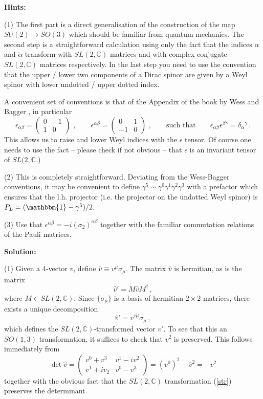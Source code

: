 \documentclass[12pt]{article}
\newcommand{\be}{\begin{equation}}
\newcommand{\ee}{\end{equation}}
\newcommand{\ol}{\overline}
\numberwithin{equation}{section}
\begin{document}
\noindent
{\bf Hints:} 

\noindent
(1) The first part is a direct generalisation of the construction of the map $SU(2)\to SO(3)$ which should be familiar from quantum mechanics. The second step is a straightforward calculation using only the fact that the indices $\alpha$ and $\dot{\alpha}$ transform with $SL(2,\mathbb{C})$ matrices and with complex conjugate $SL(2,\mathbb{C})$ matrices respectively. In the last step you need to use the convention that the upper / lower two components of a Dirac spinor are given by a Weyl spinor with lower undotted / upper dotted index. 

A convenient set of conventions is that of the Appendix of the book by Wess and Bagger \cite{Wess:1992cp}, in particular
\be
\epsilon_{\alpha\beta}=\left(\begin{array}{cc} 0 & -1 \\ 1 & 0 \end{array}
\right)\,\,,\qquad 
\epsilon^{\alpha\beta}=\left(\begin{array}{cc} 0 & 1 \\ -1 & 0 \end{array}
\right)\,\,,\qquad \mbox{such that} \qquad 
\epsilon_{\alpha\beta}\epsilon^{\beta\gamma}=\delta_\alpha{}^\gamma\,.
\ee
This allows us to raise and lower Weyl indices with the $\epsilon$ tensor. Of course one needs to use the fact -- please check if not obvious -- that $\epsilon$ is an invariant tensor of $SL(2,\mathbb{C}$.)

\noindent
(2) This is completely straightforward. Deviating from the Wess-Bagger conventions, it may be convenient to define $\gamma^5\sim \gamma^0\gamma^1\gamma^2\gamma^3$ with a prefactor which ensures that the l.h. projector (i.e. the projector on the undotted Weyl spinor) is $P_L=(\mathbbm{1}-\gamma^5)/2$. 

\noindent
(3) Use that $\epsilon^{\alpha\beta}=-i(\sigma_2)^{\alpha\beta}$ together with the familiar commutation relations of the Pauli matrices. 

\noindent
{\bf Solution:} 

\noindent
(1) Given a 4-vector $v$, define $\hat{v}\equiv v^\mu\sigma_\mu$. The matrix $\hat{v}$ is hermitian, as is the matrix
\be
\hat{v}'=M\hat{v}M^\dagger\,,\label{str}
\ee
where $M\in SL(2,\mathbb{C})$. Since $\{\sigma_\mu\}$ is a basis of hermitian $2\times 2$ matrices, there exists a unique decomposition 
\be
\hat{v}'=v'^\mu\sigma_\mu\,,
\ee
which defines the $SL(2,\mathbb{C})$-transformed vector $v'$. To see that this an $SO(1,3)$ transformation, it suffices to check that $v^2$ is preserved. This follows immediately from 
\be
\det\hat{v}=\left(\begin{array}{cc}v^0+v^3 & v^1-iv^2 \\ v^1+iv_2 & v^0-v^3
\end{array}\right)=(v^0)^2-\ol{v}^2=-v^2
\ee
together with the obvious fact that the $SL(2,\mathbb{C})$ transformation (\ref{str}) preserves the determinant. 
\end{document}
